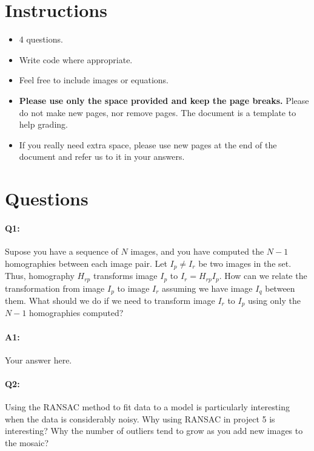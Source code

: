 \section*{Instructions}
\begin{itemize}
  \item 4 questions.
  \item Write code where appropriate.
  \item Feel free to include images or equations.
  \item \textbf{Please use only the space provided and keep the page breaks.} Please do not make new pages, nor remove pages. The document is a template to help grading.
  \item If you really need extra space, please use new pages at the end of the document and refer us to it in your answers.
\end{itemize}

\section*{Questions}

\paragraph{Q1:} Supose you have a sequence of $N$ images, and you have computed the $N-1$ homographies between each image pair.
Let $I_p \neq I_r$ be two images in the set. Thus, homography $H_{rp}$ transforms image $I_p$ to $I_r=H_{rp}I_p$.
How can we relate the transformation from image $I_p$ to image $I_r$ assuming we have image $I_q$ between them. What should we do if we need to transform image $I_r$ to $I_p$ using only the $N-1$ homographies computed?

\paragraph{A1:} Your answer here.




\pagebreak
\paragraph{Q2:} Using the RANSAC method to fit data to a model is particularly interesting when the data is considerably noisy. Why using RANSAC in project 5 is interesting? Why the number of outliers tend to grow as you add new images to the mosaic?

